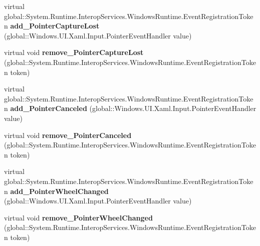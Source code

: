 \begin{DoxyCompactItemize}
\item 
\mbox{\label{class_windows_1_1_u_i_1_1_xaml_1_1_u_i_element_a66ebc4d8c8c99a7a0364051b341c48a6}} 
virtual global\+::\+System.\+Runtime.\+Interop\+Services.\+Windows\+Runtime.\+Event\+Registration\+Token {\bfseries add\+\_\+\+Pointer\+Capture\+Lost} (global\+::\+Windows.\+U\+I.\+Xaml.\+Input.\+Pointer\+Event\+Handler value)
\item 
\mbox{\label{class_windows_1_1_u_i_1_1_xaml_1_1_u_i_element_a4dc1dfa9d14ef2157a60a0da178c4784}} 
virtual void {\bfseries remove\+\_\+\+Pointer\+Capture\+Lost} (global\+::\+System.\+Runtime.\+Interop\+Services.\+Windows\+Runtime.\+Event\+Registration\+Token token)
\item 
\mbox{\label{class_windows_1_1_u_i_1_1_xaml_1_1_u_i_element_ae4cad3c4c84130d0d6362bc7aed7ba7d}} 
virtual global\+::\+System.\+Runtime.\+Interop\+Services.\+Windows\+Runtime.\+Event\+Registration\+Token {\bfseries add\+\_\+\+Pointer\+Canceled} (global\+::\+Windows.\+U\+I.\+Xaml.\+Input.\+Pointer\+Event\+Handler value)
\item 
\mbox{\label{class_windows_1_1_u_i_1_1_xaml_1_1_u_i_element_a2ce3ea526a5e9942687b9fe640cbdb26}} 
virtual void {\bfseries remove\+\_\+\+Pointer\+Canceled} (global\+::\+System.\+Runtime.\+Interop\+Services.\+Windows\+Runtime.\+Event\+Registration\+Token token)
\item 
\mbox{\label{class_windows_1_1_u_i_1_1_xaml_1_1_u_i_element_a789daf5519a2893ca5d46308010e2bae}} 
virtual global\+::\+System.\+Runtime.\+Interop\+Services.\+Windows\+Runtime.\+Event\+Registration\+Token {\bfseries add\+\_\+\+Pointer\+Wheel\+Changed} (global\+::\+Windows.\+U\+I.\+Xaml.\+Input.\+Pointer\+Event\+Handler value)
\item 
\mbox{\label{class_windows_1_1_u_i_1_1_xaml_1_1_u_i_element_ac3ff4695ca9eb06d618cbf67509cf594}} 
virtual void {\bfseries remove\+\_\+\+Pointer\+Wheel\+Changed} (global\+::\+System.\+Runtime.\+Interop\+Services.\+Windows\+Runtime.\+Event\+Registration\+Token token)

\end{DoxyCompactItemize}
